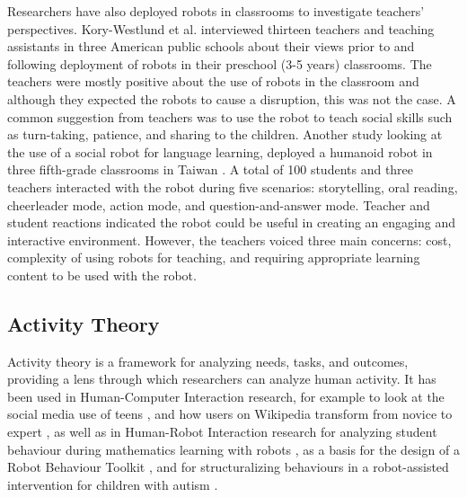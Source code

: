 Researchers have also deployed robots in classrooms to investigate teachers' perspectives. Kory-Westlund et al. \cite{Westlund2016} interviewed thirteen teachers and teaching assistants in three American public schools about their views prior to and following deployment of robots in their preschool (3-5 years) classrooms. The teachers were mostly positive about the use of robots in the classroom and although they expected the robots to cause a disruption, this was not the case. A common suggestion from teachers was to use the robot to teach social skills such as turn-taking, patience, and sharing to the children. Another study looking at the use of a social robot for language learning, deployed a humanoid robot in three fifth-grade classrooms in Taiwan \cite{chang10}. A total of 100 students and three teachers interacted with the robot during five scenarios: storytelling, oral reading, cheerleader mode, action mode, and question-and-answer mode. Teacher and student reactions indicated the robot could be useful in creating an engaging and interactive environment. However, the teachers voiced three main concerns: cost, complexity of using robots for teaching, and requiring appropriate learning content to be used with the robot. 



\subsection{Activity Theory}
\label{sec:5}
Activity theory is a framework for analyzing needs, tasks, and outcomes, providing a lens through which researchers can analyze human activity. It has been used in Human-Computer Interaction research, for example to look at the social media use of teens \cite{yardi11}, and how users on Wikipedia transform from novice to expert \cite{bryant05},
as well as in Human-Robot Interaction research for analyzing student behaviour during mathematics learning with robots \cite{fernandes2010robot}, as a basis for the design of a Robot Behaviour Toolkit \cite{huang2012robot}, and for structuralizing behaviours in a robot-assisted intervention for children with autism \cite{kim2014designing}. 

